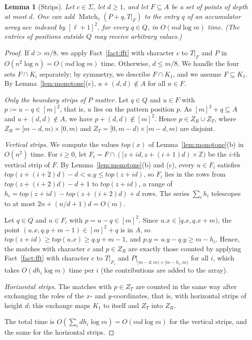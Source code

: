 \documentclass[11pt]{article}
\newtheorem{lemma}[theorem]{Lemma}
\theoremstyle{definition}
\newcommand{\Z}{\mathbb{Z}}
\renewcommand{\O}{O}
\DeclareMathOperator{\Match}{Match}
\newcommand{\x}[1]{#1.x}
\newcommand{\y}[1]{#1.y}
\begin{document}
\begin{lemma}[Strips]\label{lem:strips}
Let $c \in \Sigma$, let $d \ge 1$, and let $F \subseteq A$ be a set of points of depth at most $d$.
One can add $\Match_c(P + q, T|_F)$ to the entry $q$ of an accumulator array $\mathit{acc}$ indexed by $[\ell+1]^2$, for every $q \in Q$, in $\O(m d \log m)$ time.
(The entries of positions outside $Q$ may receive arbitrary values.)
\end{lemma}
\begin{proof}
If $d > m/8$, we apply Fact~\ref{fact:fft} with character $c$ to $T|_F$ and $P$ in $\O(n^2\log n) = \O(md \log m)$ time.
Otherwise, $d \le m/8$.
We handle the four sets $F \cap K_i$ separately; by symmetry, we describe $F \cap K_1$, and we assume $F \subseteq K_1$.
By Lemma~\ref{lem:monotone}(c), $u + (d,d) \notin A$ for all $u \in F$.

\emph{Only the boundary strips of $P$ matter.} Let $q \in Q$ and $u \in F$ with $p := u - q \in [m]^2$, that is, $u$ lies on the pattern position $p$.
As $[m]^2 + q \subseteq A$ and $u + (d,d) \notin A$, we have $p + (d,d) \notin [m]^2$.
Hence $p \in Z_R \cup Z_T$, where $Z_R = [m-d, m) \times [0, m)$ and $Z_T = [0, m-d) \times [m-d, m)$ are disjoint.

\emph{Vertical strips.} We compute the values $\mathit{top}(x)$ of Lemma~\ref{lem:monotone}(b) in $\O(n^2)$ time. For $i \ge 0$, let $F_i = F \cap ([z + id, z + (i+1)d) \times \Z)$ be the $i$-th vertical strip of $F$.
By Lemma~\ref{lem:monotone}(b) and (c), every $u \in F_i$ satisfies $\mathit{top}(z + (i+2)d) - d < \y u \le \mathit{top}(z + id)$, so $F_i$ lies in the rows from $\mathit{top}(z + (i+2)d) - d + 1$ to $\mathit{top}(z + id)$, a range of $h_i = \mathit{top}(z + id) - \mathit{top}(z + (i+2)d) + d$ rows.
The series $\sum_i h_i$ telescopes to at most $2n + (n/d + 1)d = \O(m)$.

Let $q \in Q$ and $u \in F_i$ with $p = u - q \in [m]^2$.
Since $\x u \in [\x q, \x q + m)$, the point $(\x u, \y q + m - 1) \in [m]^2 + q$ is in $A$, so $\mathit{top}(z + id) \ge \mathit{top}(\x u) \ge \y q + m - 1$, and $\y p = \y u - \y q \ge m - h_i$.
Hence, the matches with character $c$ and $p \in Z_R$ are exactly those counted by applying Fact~\ref{fact:fft} with character $c$ to $T|_{F_i}$ and $P|_{[m-d, m) \times [m-h_i, m)}$ for all $i$, which takes $\O(dh_i \log m)$ time per $i$ (the contributions are added to the array).

\emph{Horizontal strips.} The matches with $p \in Z_T$ are counted in the same way after exchanging the roles of the $x$- and $y$-coordinates, that is, with horizontal strips of height $d$; this exchange maps $K_1$ to itself and $Z_T$ into $Z_R$.

The total time is $\O(\sum_i dh_i \log m) = \O(md\log m)$ for the vertical strips, and the same for the horizontal strips.
\end{proof}
\end{document}

